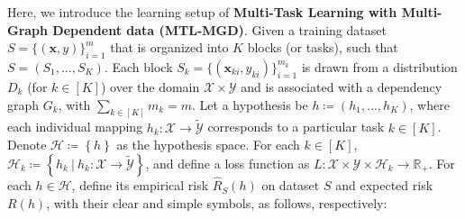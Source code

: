\documentclass{article}
\def\sR{\mathbb{R}}
\def\vx{{\mathbf{x}}}
\def\ty{\tilde{y}}
\begin{document}
Here, we introduce the learning setup of \textbf{Multi-Task Learning with Multi-Graph Dependent data (MTL-MGD)}.
Given a training dataset \( S = \{(\vx, y)\}_{i=1}^{m} \) that is organized into \( K \) 
blocks (or tasks), such that \( S = (S_1, \dots, S_K) \). Each block \( S_k = \{(\vx_{ki}, y_{ki})\}_{i=1}^{m_k} \) is drawn from a distribution \( D_k \) (for \( k \in [K] \)) over the domain \( \mathcal{X} \times \mathcal{Y} \) and is associated with a dependency graph \( G_k \), 
with \( \sum_{k \in [K]} m_k = m \). 
Let a hypothesis be ${h} \coloneq ({h}_1, \dots, {h}_K)$,
where each individual mapping \( {h}_k: \mathcal{X} \rightarrow \widetilde{\mathcal{Y}} \) corresponds to a particular task \( k \in [K] \).
Denote $\mathcal{H} \coloneq \left \{ h \right \}$ as the hypothesis space. For each $k \in [K]$, $\mathcal{H}_k \coloneq \left \{{h}_k ~|~ {h}_k: \mathcal{X} \rightarrow \widetilde{\mathcal{Y}} \right \}$, 
and define a loss function as $L: \mathcal{X} \times \mathcal{Y} \times \mathcal{H}_k \rightarrow \sR_+$. For each ${h} \in \mathcal{H}$, define its empirical risk $\widehat{R}_{S}(h)$ on dataset $S$ and expected risk $R(h)$, with their clear and simple symbols, as follows, respectively: 
\end{document}
